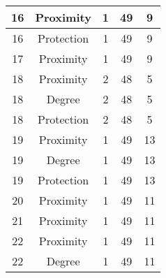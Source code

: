 \documentclass[results.tex]{subfiles}
\begin{document}
\begin{center}
\begin{tabular}{| c || c | c | c | c |}
            \hline
            16                      & Proximity                    & 1                      & 49                      & 9                    \\
            \hline
            16                      & Protection                   & 1                      & 49                      & 9                    \\
            \hline
            17                      & Proximity                    & 1                      & 49                      & 9                    \\
            \hline
            18                      & Proximity                    & 2                      & 48                      & 5                    \\
            \hline
            18                      & Degree                       & 2                      & 48                      & 5                    \\
            \hline
            18                      & Protection                   & 2                      & 48                      & 5                    \\
            \hline
            19                      & Proximity                    & 1                      & 49                      & 13                   \\
            \hline
            19                      & Degree                       & 1                      & 49                      & 13                   \\
            \hline
            19                      & Protection                   & 1                      & 49                      & 13                   \\
            \hline
            20                      & Proximity                    & 1                      & 49                      & 11                   \\
            \hline
            21                      & Proximity                    & 1                      & 49                      & 11                   \\
            \hline
            22                      & Proximity                    & 1                      & 49                      & 11                   \\
            \hline
            22                      & Degree                       & 1                      & 49                      & 11                   \\

\end{tabular}
\end{center}
\end{document}
